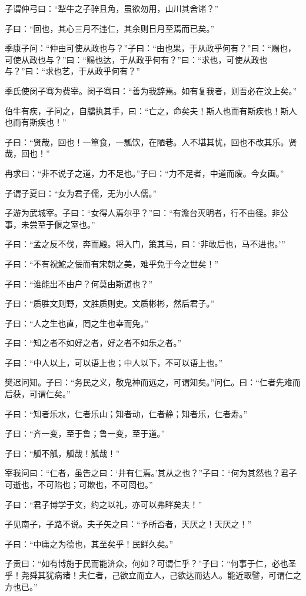 \documentclass[twoside,openany]{book}
\begin{document}
子谓仲弓曰：“犁牛之子骍且角，虽欲勿用，山川其舍诸？”

子曰：“回也，其心三月不违仁，其余则日月至焉而已矣。”

季康子问：“仲由可使从政也与？”子曰：“由也果，于从政乎何有？”曰：“赐也，可使从政也与？”曰：“赐也达，于从政乎何有？”曰：“求也，可使从政也与？”曰：“求也艺，于从政乎何有？”

季氏使闵子骞为费宰。闵子骞曰：“善为我辞焉。如有复我者，则吾必在汶上矣。”

伯牛有疾，子问之，自牖执其手，曰：“亡之，命矣夫！斯人也而有斯疾也！斯人也而有斯疾也！”

子曰：“贤哉，回也！一箪食，一瓢饮，在陋巷。人不堪其忧，回也不改其乐。贤哉，回也！”

冉求曰：“非不说子之道，力不足也。”子曰：“力不足者，中道而废。今女画。”

子谓子夏曰：“女为君子儒，无为小人儒。”

子游为武城宰。子曰：“女得人焉尔乎？”曰：“有澹台灭明者，行不由径。非公事，未尝至于偃之室也。”

子曰：“孟之反不伐，奔而殿。将入门，策其马，曰：‘非敢后也，马不进也。’”

子曰：“不有祝鮀之佞而有宋朝之美，难乎免于今之世矣！”

子曰：“谁能出不由户？何莫由斯道也？”

子曰：“质胜文则野，文胜质则史。文质彬彬，然后君子。”

子曰：“人之生也直，罔之生也幸而免。”

子曰：“知之者不如好之者，好之者不如乐之者。”

子曰：“中人以上，可以语上也；中人以下，不可以语上也。”

樊迟问知。子曰：“务民之义，敬鬼神而远之，可谓知矣。”问仁。曰：“仁者先难而后获，可谓仁矣。”

子曰：“知者乐水，仁者乐山；知者动，仁者静；知者乐，仁者寿。”

子曰：“齐一变，至于鲁；鲁一变，至于道。”

子曰：“觚不觚，觚哉！觚哉！”

宰我问曰：“仁者，虽告之曰：‘井有仁焉。’其从之也？”子曰：“何为其然也？君子可逝也，不可陷也；可欺也，不可罔也。”

子曰：“君子博学于文，约之以礼，亦可以弗畔矣夫！”

子见南子，子路不说。夫子矢之曰：“予所否者，天厌之！天厌之！”

子曰：“中庸之为德也，其至矣乎！民鲜久矣。”

子贡曰：“如有博施于民而能济众，何如？可谓仁乎？”子曰：“何事于仁，必也圣乎！尧舜其犹病诸！夫仁者，己欲立而立人，己欲达而达人。能近取譬，可谓仁之方也已。” 
\end{document}
